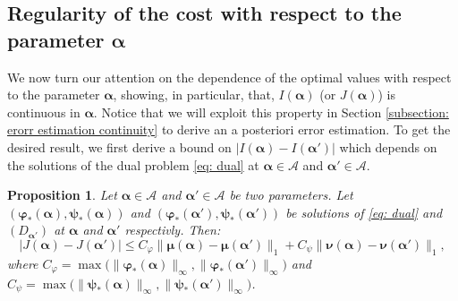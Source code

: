 \documentclass{article}
\def\cA{\mathcal{A}}
\def\aalpha{\boldsymbol{\alpha}}
\def\pphi{\boldsymbol{\varphi}}
\def\ppsi{\boldsymbol{\psi}}
\def\mmu{\boldsymbol{\mu}}
\def\nnu{\boldsymbol{\nu}}
\newtheorem{prop}[thm]{Proposition}
\begin{document}
\subsection{Regularity of the cost with respect to the parameter \texorpdfstring{$\aalpha$}{}}
%
We now turn our attention on  the dependence of the optimal values with respect to the parameter $\aalpha$, showing, in particular, that, $I(\aalpha)$ (or $J(\aalpha)$) is  continuous in $\aalpha$. Notice that we will exploit this property in Section \ref{subsection: erorr estimation continuity} to derive an a posteriori error estimation. 
%
To get the desired result, we first derive a bound on $|I(\aalpha)- I(\aalpha ')|$  which depends on the solutions of the dual problem \ref{eq: dual}  at $\aalpha \in \cA$ and $\aalpha ' \in \cA$.
%
\begin{prop} \label{prop: alpha dependency - bound with potentials}
    Let $\aalpha \in \cA$ and $\aalpha ' \in \cA$ be two parameters. Let $(\pphi_*(\aalpha), \ppsi_*(\aalpha))$ and $(\pphi_*(\aalpha '), \ppsi_*(\aalpha '))$ be solutions of \eqref{eq: dual} and $(D_{\aalpha'})$ at $\aalpha$ and $\aalpha '$ respectivly. Then:
    \begin{equation*}
        |J(\aalpha) - J(\aalpha ')| \leq C_\varphi \| \mmu(\aalpha) - \mmu(\aalpha ') \|_1 
        + C_\psi  \| \nnu(\aalpha) - \nnu(\aalpha ') \|_1,
    \end{equation*}
    where $C_\varphi=\max\big( \| \pphi_*(\aalpha) \|_\infty , \| \pphi_*(\aalpha ') \|_\infty  \big)$ and $C_\psi=\max\big( \| \ppsi_*(\aalpha) \|_\infty , \| \ppsi_*(\aalpha' ) \|_\infty  \big)$.
\end{prop}
%
\end{document}
